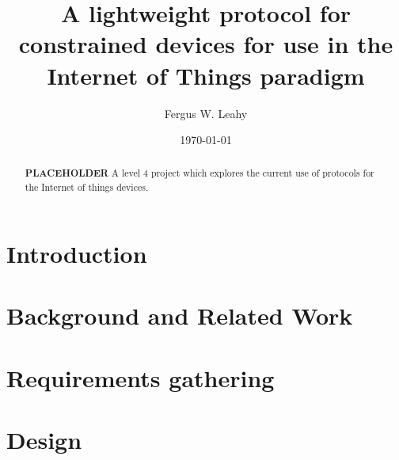 \documentclass{l4proj}
\begin{document}
\title{A lightweight protocol for constrained devices for use in the Internet of Things paradigm}
\author{Fergus W. Leahy}
\date{\today}
\maketitle

\begin{abstract}
\textbf{PLACEHOLDER}
A level 4 project which explores the current use of protocols for the Internet of things devices.
\end{abstract}

\educationalconsent
%
%
\tableofcontents

\chapter{Introduction}

\chapter{Background and Related Work} %
\label{cha:background}




\chapter{Requirements gathering} %
\label{cha:requirements_gathering}






\chapter{Design} %
\label{cha:design}

\end{document}
